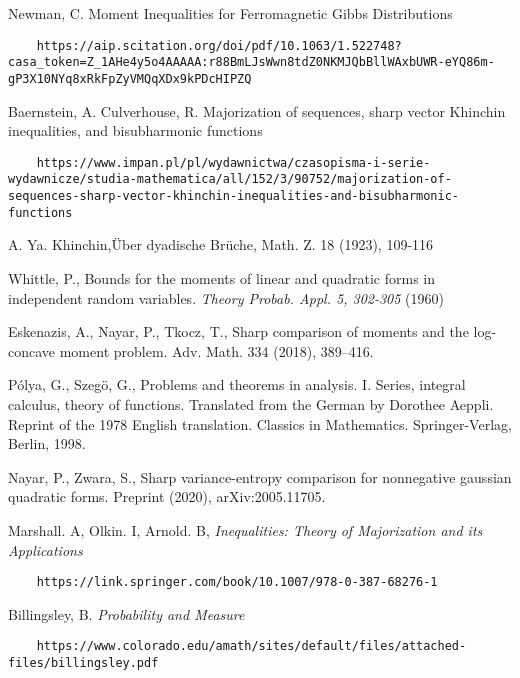 \documentclass[10pt]{article}
\newcommand{\1}{\textbf{1}}
\theoremstyle{remark}
\theoremstyle{definition}
\begin{document}
\begin{thebibliography}{9}
 Newman, C. Moment Inequalities for Ferromagnetic Gibbs Distributions

\begin{verbatim}
	https://aip.scitation.org/doi/pdf/10.1063/1.522748?casa_token=Z_1AHe4y5o4AAAAA:r88BmLJsWwn8tdZ0NKMJQbBllWAxbUWR-eYQ86m-gP3X10NYq8xRkFpZyVMQqXDx9kPDcHIPZQ
\end{verbatim}

 Baernstein, A. Culverhouse, R. Majorization of sequences, sharp vector Khinchin inequalities, and bisubharmonic functions

\begin{verbatim}
	https://www.impan.pl/pl/wydawnictwa/czasopisma-i-serie-wydawnicze/studia-mathematica/all/152/3/90752/majorization-of-sequences-sharp-vector-khinchin-inequalities-and-bisubharmonic-functions
\end{verbatim}

 A. Ya. Khinchin,{\"U}ber dyadische Br{\"u}che, Math. Z. 18 (1923), 109-116

 Whittle, P., Bounds for the moments of linear and quadratic forms in independent random variables. \textit{Theory Probab. Appl. 5, 302-305} (1960)

Eskenazis, A., Nayar, P., Tkocz, T., Sharp comparison of moments and the log-concave moment problem. Adv. Math. 334 (2018), 389--416.

P\'olya, G., Szeg\"o, G., 
Problems and theorems in analysis. I. Series, integral calculus, theory of functions. Translated from the German by Dorothee Aeppli. Reprint of the 1978 English translation. Classics in Mathematics. Springer-Verlag, Berlin, 1998.

Nayar, P., Zwara, S.,
Sharp variance-entropy comparison for nonnegative gaussian quadratic forms. Preprint (2020), arXiv:2005.11705.


 Marshall. A, Olkin. I, Arnold. B, \textit{Inequalities: Theory of Majorization and its Applications}

\begin{verbatim}
	https://link.springer.com/book/10.1007/978-0-387-68276-1
\end{verbatim}

 Billingsley, B. \textit{Probability and Measure} 

\begin{verbatim}
	https://www.colorado.edu/amath/sites/default/files/attached-files/billingsley.pdf
\end{verbatim}


\end{thebibliography}
\end{document}
